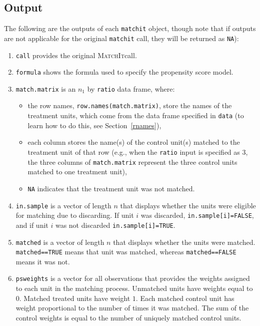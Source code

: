 \documentclass[oneside,letterpaper,titlepage]{article}
\newcommand{\MatchIt}{\textsc{MatchIt}}
\begin{document}
\subsection{Output}

The following are the outputs of each \texttt{matchit} object, though
note that if outputs are not applicable for the original
\texttt{matchit} call, they will be returned as \texttt{NA}): 

\begin{enumerate}

\item \texttt{call} provides the original \MatchIt call.
 
\item \texttt{formula} shows the formula used to specify the propensity score model.

\item \texttt{match.matrix} is an $n_1$ by \texttt{ratio} data frame,
  where:

  \begin{itemize}
  \item the row names, \texttt{row.names(match.matrix)}, store the
    names of the treatment units, which come from the data frame
    specified in \texttt{data} (to learn how to do this, see
    Section~\ref{rnames}),
  \item each column stores the name(s) of the control unit(s) matched
    to the treatment unit of that row (e.g., when the \texttt{ratio}
    input is specified as 3, the three columns of
    \texttt{match.matrix} represent the three control units matched to
    one treatment unit),
   \item \texttt{NA} indicates that the treatment unit was not
     matched.  
   \end{itemize}

\item \texttt{in.sample} is a vector of length $n$ that
  displays whether the units were eligible for matching due to
  discarding.  If unit $i$ was discarded, \texttt{in.sample[i]=FALSE},
  and if unit $i$ was not discarded \texttt{in.sample[i]=TRUE}.

\item \texttt{matched} is a vector of length $n$ that displays whether the units were matched.  \texttt{matched==TRUE} means
that unit was matched, whereas \texttt{matched==FALSE} means it was not.

\item \texttt{psweights} is a vector for all observations that provides
  the weights assigned to each unit in the 
  matching process.  Unmatched units have weights equal to $0$. Matched
  treated units have weight $1$.  Each matched control unit has weight proportional to the number of times it was matched.  The sum of the control
  weights is equal to the number of uniquely matched control units.


\end{enumerate}
\end{document}
